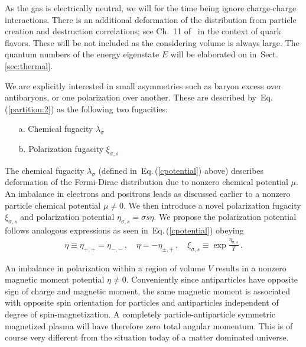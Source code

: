 \documentclass[aps,prd,floatfix,reprint]{revtex4-2}
\newcommand{\req}[1]{Eq.\,(\ref{#1})}
\newcommand{\rsec}[1]{Sect.\,{\ref{#1}}}
\begin{document}
As the gas is electrically neutral, we will for the time being ignore charge-charge interactions. There is an additional deformation of the distribution from particle creation and destruction correlations; see Ch.~11 of~\cite{Letessier:2002ony} in the context of quark flavors. These will be not included as the considering volume is always large. The quantum numbers of the energy eigenstate $E$ will be elaborated on in~\rsec{sec:thermal}.

We are explicitly interested in small asymmetries such as baryon excess over antibaryons, or one polarization over another. These are described by~\req{partition:2} as the following two fugacities:
\begin{itemize}
 \item[a.] Chemical fugacity $\lambda_{\sigma}$
 \item[b.] Polarization fugacity $\xi_{\sigma,s}$
\end{itemize}
The chemical fugacity $\lambda_{\sigma}$ (defined in~\req{cpotential} above) describes deformation of the Fermi-Dirac distribution due to nonzero chemical potential $\mu$. An imbalance in electrons and positrons leads as discussed earlier to a nonzero particle chemical potential $\mu\neq0$. We then introduce a novel polarization fugacity $\xi_{\sigma,s}$ and polarization potential $\eta_{\sigma,s}=\sigma s\eta$. We propose the polarization potential follows analogous expressions as seen in~\req{cpotential} obeying
\begin{align}
 \label{spotential}
 \eta\equiv\eta_{+,+}=\eta_{-,-}\,,\quad\eta=-\eta_{\pm,\mp}\,,\quad\xi_{\sigma,s}\equiv\exp{\frac{\eta_{\sigma,s}}{T}}\,.
\end{align}

An imbalance in polarization within a region of volume $V$ results in a nonzero magnetic moment potential $\eta\neq0$. Conveniently since antiparticles have opposite sign of charge and magnetic moment, the same magnetic moment is associated with opposite spin orientation for particles and antiparticles independent of degree of spin-magnetization. A completely particle-antiparticle symmetric magnetized plasma will have therefore zero total angular momentum. This is of course very different from the situation today of a matter dominated universe.

\end{document}
